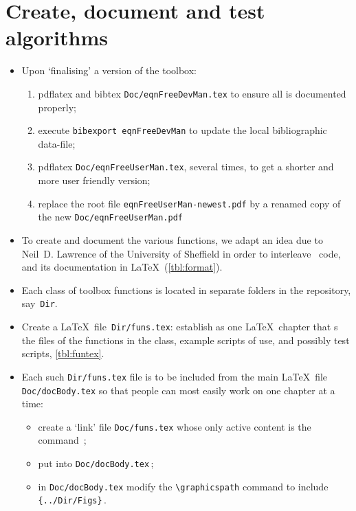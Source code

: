 \chapter{Create, document and test algorithms}
\label{sec:contribute}
\secttoc
\def\LaTeX{LaTeX}%


\begin{itemize}
\item Upon `finalising' a version of the toolbox: \begin{enumerate}
\item pdflatex and bibtex \verb|Doc/eqnFreeDevMan.tex| to ensure all is documented properly;  
\item execute \verb|bibexport eqnFreeDevMan| to update the local bibliographic data-file;
\item pdflatex \verb|Doc/eqnFreeUserMan.tex|, several times, to get a shorter and more user friendly version;
\item replace the root file \verb|eqnFreeUserMan-newest.pdf| by a renamed copy of the new \verb|Doc/eqnFreeUserMan.pdf|
\end{enumerate}

\item To create and document the various functions, we adapt an idea due to Neil~D. Lawrence of the University of Sheffield in order to interleave \script\ code, and its documentation in \LaTeX\ (\cref{tbl:format}).

\item Each class of toolbox functions is located in separate folders in the repository, say~\verb|Dir|.

\item Create a \LaTeX\ file~\verb|Dir/funs.tex|: establish as one \LaTeX\ chapter that \verb||s the  files of the functions in the class, example scripts of use, and possibly test scripts, \autoref{tbl:funtex}.

\item Each such \verb|Dir/funs.tex| file is to be included from the main \LaTeX\ file \verb|Doc/docBody.tex| so that people can most easily work on one chapter at a time: 
\begin{itemize}
\item create a `link' file \verb|Doc/funs.tex| whose only active content is the command \verb||\,;
\item put \verb|| into \verb|Doc/docBody.tex|\,;
\item in \verb|Doc/docBody.tex| modify the \verb|\graphicspath| command to include \verb|{../Dir/Figs}|\,.
\end{itemize}


\end{itemize}
